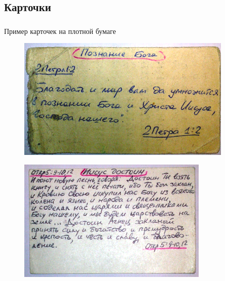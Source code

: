 \documentclass[t,aspectratio=169]{beamer}  %
\begin{document}
\subsection{Карточки}
\begin{frame}[c]
	\frametitle{\insertsection}
	\framesubtitle{\insertsubsection}
	Пример карточек на плотной бумаге
	 \begin{multicols*}{2}
		\begin{figure}
			\includegraphics[height=0.4\textheight]{card-2Pe_1.2}
		\end{figure}
		\begin{figure}
			\includegraphics[height=0.4\textheight]{card-Re}
		\end{figure}	
	 \end{multicols*}
\end{frame}
\end{document}
